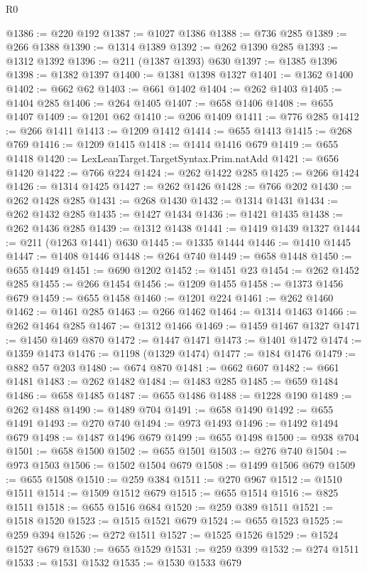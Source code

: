 \begin{lexlean}{R0}
\begin{coremodule}
@1386 := @220 @192
@1387 := @1027 @1386
@1388 := @736 @285
@1389 := @266 @1388
@1390 := @1314 @1389
@1392 := @262 @1390 @285
@1393 := @1312 @1392
@1396 := @211 (@1387 @1393) @630
@1397 := @1385 @1396
@1398 := @1382 @1397
@1400 := @1381 @1398 @1327
@1401 := @1362 @1400
@1402 := @662 @62
@1403 := @661 @1402
@1404 := @262 @1403
@1405 := @1404 @285
@1406 := @264 @1405
@1407 := @658 @1406
@1408 := @655 @1407
@1409 := @1201 @62
@1410 := @206 @1409
@1411 := @776 @285
@1412 := @266 @1411
@1413 := @1209 @1412
@1414 := @655 @1413
@1415 := @268 @769
@1416 := @1209 @1415
@1418 := @1414 @1416 @679
@1419 := @655 @1418
@1420 := LexLeanTarget.TargetSyntax.Prim.natAdd
@1421 := @656 @1420
@1422 := @766 @224
@1424 := @262 @1422 @285
@1425 := @266 @1424
@1426 := @1314 @1425
@1427 := @262 @1426
@1428 := @766 @202
@1430 := @262 @1428 @285
@1431 := @268 @1430
@1432 := @1314 @1431
@1434 := @262 @1432 @285
@1435 := @1427 @1434
@1436 := @1421 @1435
@1438 := @262 @1436 @285
@1439 := @1312 @1438
@1441 := @1419 @1439 @1327
@1444 := @211 (@1263 @1441) @630
@1445 := @1335 @1444
@1446 := @1410 @1445
@1447 := @1408 @1446
@1448 := @264 @740
@1449 := @658 @1448
@1450 := @655 @1449
@1451 := @690 @1202
@1452 := @1451 @23
@1454 := @262 @1452 @285
@1455 := @266 @1454
@1456 := @1209 @1455
@1458 := @1373 @1456 @679
@1459 := @655 @1458
@1460 := @1201 @224
@1461 := @262 @1460
@1462 := @1461 @285
@1463 := @266 @1462
@1464 := @1314 @1463
@1466 := @262 @1464 @285
@1467 := @1312 @1466
@1469 := @1459 @1467 @1327
@1471 := @1450 @1469 @870
@1472 := @1447 @1471
@1473 := @1401 @1472
@1474 := @1359 @1473
@1476 := @1198 (@1329 @1474)
@1477 := @184 @1476
@1479 := @882 @57 @203
@1480 := @674 @870
@1481 := @662 @607
@1482 := @661 @1481
@1483 := @262 @1482
@1484 := @1483 @285
@1485 := @659 @1484
@1486 := @658 @1485
@1487 := @655 @1486
@1488 := @1228 @190
@1489 := @262 @1488
@1490 := @1489 @704
@1491 := @658 @1490
@1492 := @655 @1491
@1493 := @270 @740
@1494 := @973 @1493
@1496 := @1492 @1494 @679
@1498 := @1487 @1496 @679
@1499 := @655 @1498
@1500 := @938 @704
@1501 := @658 @1500
@1502 := @655 @1501
@1503 := @276 @740
@1504 := @973 @1503
@1506 := @1502 @1504 @679
@1508 := @1499 @1506 @679
@1509 := @655 @1508
@1510 := @259 @384
@1511 := @270 @967
@1512 := @1510 @1511
@1514 := @1509 @1512 @679
@1515 := @655 @1514
@1516 := @825 @1511
@1518 := @655 @1516 @684
@1520 := @259 @389 @1511
@1521 := @1518 @1520
@1523 := @1515 @1521 @679
@1524 := @655 @1523
@1525 := @259 @394
@1526 := @272 @1511
@1527 := @1525 @1526
@1529 := @1524 @1527 @679
@1530 := @655 @1529
@1531 := @259 @399
@1532 := @274 @1511
@1533 := @1531 @1532
@1535 := @1530 @1533 @679

\end{coremodule}
\end{lexlean}
